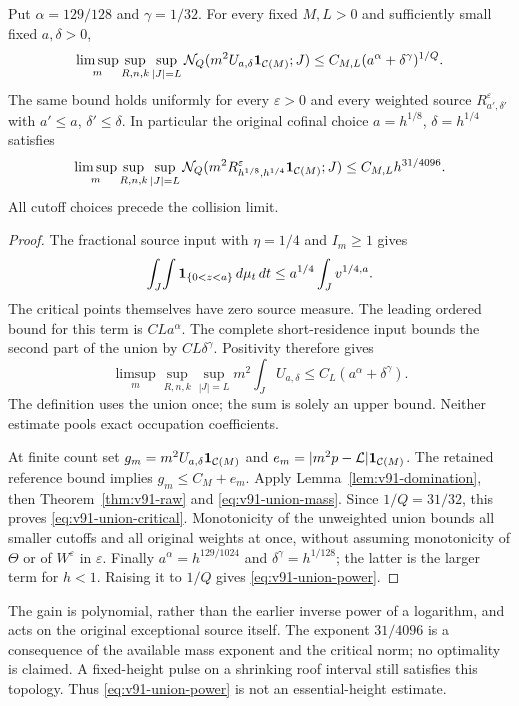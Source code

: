 \begin{theorem}
\label{thm:v91-exceptional}
Put $\alpha=129/128$ and $\gamma=1/32$. For every fixed $M,L>0$
and sufficiently small fixed $a,\delta>0$,
\begin{equation}\label{eq:v91-union-critical}
 \limsup_m\sup_{R,n,k}\sup_{|J|=L}
 \mathcal N_Q(m^2U_{a,\delta}\one_{\mathcal C(M)};J)
               \le C_{M,L}(a^\alpha+\delta^\gamma)^{1/Q}.
\end{equation}
The same bound holds uniformly for every $\varepsilon>0$ and every
weighted source $R_{a',\delta'}^\varepsilon$ with
$a'\le a$, $\delta'\le\delta$. In particular the original cofinal
choice $a=h^{1/8}$, $\delta=h^{1/4}$ satisfies
\begin{equation}\label{eq:v91-union-power}
 \limsup_m\sup_{R,n,k}\sup_{|J|=L}
 \mathcal N_Q(m^2R_{h^{1/8},h^{1/4}}^\varepsilon
                       \one_{\mathcal C(M)};J)
                            \le C_{M,L}h^{31/4096}.
\end{equation}
All cutoff choices precede the collision limit.
\end{theorem}
\begin{proof}
The fractional source input with $\eta=1/4$ and $I_m\ge1$ gives
\[
 \int_J\!\int\mathbf1_{\{0<z<a\}}\,d\mu_t\,dt
                \le a^{1/4}\int_Jv^{1/4,a}.
\]
The critical points themselves have zero source measure. The leading
ordered bound for this term is $CL a^\alpha$. The complete
short-residence input bounds the second part of the union by
$CL\delta^\gamma$. Positivity therefore gives
\begin{equation}\label{eq:v91-union-mass}
 \limsup_m\sup_{R,n,k}\sup_{|J|=L}m^2\int_J U_{a,\delta}
                         \le C_L(a^\alpha+\delta^\gamma).
\end{equation}
The definition uses the union once; the sum is solely an upper bound.
Neither estimate pools exact occupation coefficients.

At finite count set
$g_m=m^2U_{a,\delta}\mathbf1_{\mathcal C(M)}$ and
$e_m=|m^2p-\mathcal L|\mathbf1_{\mathcal C(M)}$. The retained
reference bound implies $g_m\le C_M+e_m$. Apply
Lemma~\ref{lem:v91-domination}, then
Theorem~\ref{thm:v91-raw} and \eqref{eq:v91-union-mass}.
Since $1/Q=31/32$, this proves \eqref{eq:v91-union-critical}.
Monotonicity of the unweighted union bounds all smaller cutoffs and
all original weights at once, without assuming monotonicity of
$\Theta$ or of $W^\varepsilon$ in $\varepsilon$.
Finally $a^\alpha=h^{129/1024}$ and
$\delta^\gamma=h^{1/128}$; the latter is the larger term for
$h<1$. Raising it to $1/Q$ gives \eqref{eq:v91-union-power}.
\end{proof}

The gain is polynomial, rather than the earlier inverse power of a
logarithm, and acts on the original exceptional source itself. The
exponent $31/4096$ is a consequence of the available mass exponent
and the critical norm; no optimality is claimed. A fixed-height
pulse on a shrinking roof interval still satisfies this topology.
Thus \eqref{eq:v91-union-power} is not an essential-height estimate.
